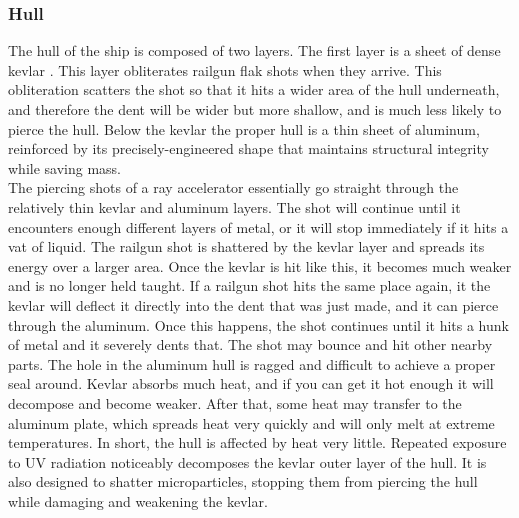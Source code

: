 \documentclass[a4paper]{article}
\begin{document}
\vspace{-0.5cm} \hspace{-18pt} \subsubsection{Hull} \label{outer_hull} \vspace{-0.2cm}
The hull of the ship is composed of two layers. The first layer is a sheet of dense kevlar \cite{kevlar_properties}. This layer obliterates railgun flak shots when they arrive. This obliteration scatters the shot so that it hits a wider area of the hull underneath, and therefore the dent will be wider but more shallow, and is much less likely to pierce the hull. Below the kevlar the proper hull is a thin sheet of aluminum, reinforced by its precisely-engineered shape that maintains structural integrity while saving mass.
\\ \pbhw
{The piercing shots of a ray accelerator essentially go straight through the relatively thin kevlar and aluminum layers. The shot will continue until it encounters enough different layers of metal, or it will stop immediately if it hits a vat of liquid.}
{The railgun shot is shattered by the kevlar layer and spreads its energy over a larger area. Once the kevlar is hit like this, it becomes much weaker and is no longer held taught. If a railgun shot hits the same place again, it the kevlar will deflect it directly into the dent that was just made, and it can pierce through the aluminum. Once this happens, the shot continues until it hits a hunk of metal and it severely dents that. The shot may bounce and hit other nearby parts. The hole in the aluminum hull is ragged and difficult to achieve a proper seal around.}
{Kevlar absorbs much heat, and if you can get it hot enough it will decompose and become weaker. After that, some heat may transfer to the aluminum plate, which spreads heat very quickly and will only melt at extreme temperatures. In short, the hull is affected by heat very little.}
{Repeated exposure to UV radiation noticeably decomposes the kevlar outer layer of the hull. It is also designed to shatter microparticles, stopping them from piercing the hull while damaging and weakening the kevlar. }
\end{document}
